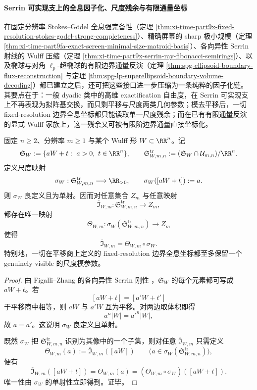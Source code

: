 \paragraph{Serrin 可实现支上的全息因子化、尺度残余与有限通量坐标}
在固定分辨率 Stokes--Gödel 全息强完备性（定理 \ref{thm:xi-time-part9x-fixed-resolution-stokes-godel-strong-completeness}）、精确屏幕的 sharp 极小规模（定理 \ref{thm:xi-time-part9fa-exact-screen-minimal-size-matroid-basis}）、各向异性 Serrin 射线的 Wulff 压缩（定理 \ref{thm:xi-time-part9x-serrin-ray-fibonacci-semirings}）、以及椭球与对角 \(\ell_p\)-超椭球的有限边界通量反演（定理 \ref{thm:spg-ellipsoid-boundary-flux-reconstruction} 与定理 \ref{thm:spg-lp-superellipsoid-boundary-volume-decoding}）都已建立之后，还可把这些接口进一步压缩为一条纯粹的因子化链。其要点在于：一般 dyadic 类中的高维 exactification 自由度，在 Serrin 可实现支上不再表现为拟阵基交换，而只剩平移与尺度两类几何参数；模去平移后，一切 fixed-resolution 边界全息坐标都只能读取单一尺度残余；而在已有有限通量反演的显式 Wulff 家族上，这一残余又可被有限阶边界通量直接坐标化。

\begin{theorem}\label{thm:xi-time-part9xbb-serrin-quotient-holography-factors-through-scale}
固定 \(n\ge 2\)、分辨率 \(m\ge 1\) 与某个 Wulff 形 \(W\subset\RR^n\)。记
\[
\mathfrak S_W:=\{aW+t:\ a>0,\ t\in\RR^n\},
\qquad
\mathfrak S_{W,m,n}^{\mathrm{tr}}
:=
(\mathfrak S_W\cap \mathcal U_{m,n})/\RR^n.
\]
定义尺度映射
\[
\sigma_W:\mathfrak S_{W,m,n}^{\mathrm{tr}}\longrightarrow \RR_{>0},
\qquad
\sigma_W([aW+t]):=a.
\]
则 \(\sigma_W\) 良定义且为单射。因而对任意集合 \(Z_m\) 与任意映射
\[
\overline{\mathfrak I}_{W,m}:\mathfrak S_{W,m,n}^{\mathrm{tr}}\to Z_m,
\]
都存在唯一映射
\[
\Theta_{W,m}:\sigma_W(\mathfrak S_{W,m,n}^{\mathrm{tr}})\to Z_m
\]
使得
\[
\overline{\mathfrak I}_{W,m}
=
\Theta_{W,m}\circ \sigma_W.
\]
特别地，一切在平移商上定义的 fixed-resolution 边界全息坐标都至多保留一个 genuinely visible 的尺度模参数。
\end{theorem}
\begin{proof}
由 Figalli--Zhang 的各向异性 Serrin 刚性 \cite{FigalliZhang2026AnisotropicSerrinGeneralDomains}，\(\mathfrak S_W\) 的每个元素都可写成 \(aW+t\)。若
\[
[aW+t]=[a'W+t']
\]
于平移商中相等，则 \(aW\) 与 \(a'W\) 互为平移。对两边取体积即得
\[
a^n|W|=a'^n|W|,
\]
故 \(a=a'\)。这说明 \(\sigma_W\) 良定义且单射。

既然 \(\sigma_W\) 把 \(\mathfrak S_{W,m,n}^{\mathrm{tr}}\) 识别为其像中的一个子集，则对任意 \(\overline{\mathfrak I}_{W,m}\) 只需定义
\[
\Theta_{W,m}(a):=\overline{\mathfrak I}_{W,m}([aW])
\qquad
\bigl(a\in \sigma_W(\mathfrak S_{W,m,n}^{\mathrm{tr}})\bigr),
\]
便有
\[
\overline{\mathfrak I}_{W,m}([aW+t])
=
\Theta_{W,m}(a)
=
(\Theta_{W,m}\circ\sigma_W)([aW+t]).
\]
唯一性由 \(\sigma_W\) 的单射性立即得到。证毕。
\end{proof}


